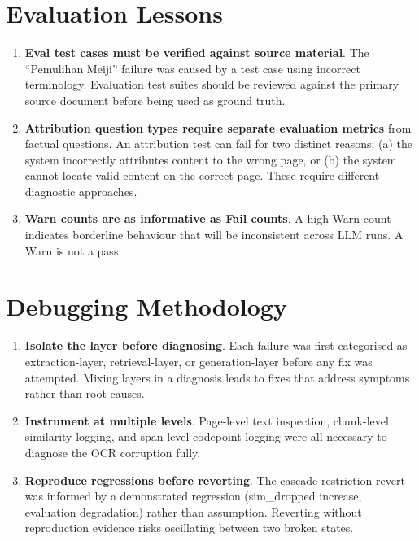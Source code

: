 \documentclass[12pt, a4paper]{report}
\begin{document}
\section{Evaluation Lessons}

\begin{enumerate}
  \item \textbf{Eval test cases must be verified against source material}.
        The ``Pemulihan Meiji'' failure was caused by a test case using
        incorrect terminology. Evaluation test suites should be reviewed
        against the primary source document before being used as ground truth.

  \item \textbf{Attribution question types require separate evaluation metrics}
        from factual questions. An attribution test can fail for two distinct
        reasons: (a) the system incorrectly attributes content to the wrong
        page, or (b) the system cannot locate valid content on the correct page.
        These require different diagnostic approaches.

  \item \textbf{Warn counts are as informative as Fail counts}. A high Warn
        count indicates borderline behaviour that will be inconsistent across
        LLM runs. A Warn is not a pass.
\end{enumerate}

\section{Debugging Methodology}

\begin{enumerate}
  \item \textbf{Isolate the layer before diagnosing}. Each failure was first
        categorised as extraction-layer, retrieval-layer, or generation-layer
        before any fix was attempted. Mixing layers in a diagnosis leads to
        fixes that address symptoms rather than root causes.

  \item \textbf{Instrument at multiple levels}. Page-level text inspection,
        chunk-level similarity logging, and span-level codepoint logging were
        all necessary to diagnose the OCR corruption fully.

  \item \textbf{Reproduce regressions before reverting}. The cascade restriction
        revert was informed by a demonstrated regression (sim\_dropped increase,
        evaluation degradation) rather than assumption. Reverting without
        reproduction evidence risks oscillating between two broken states.
\end{enumerate}
\end{document}
